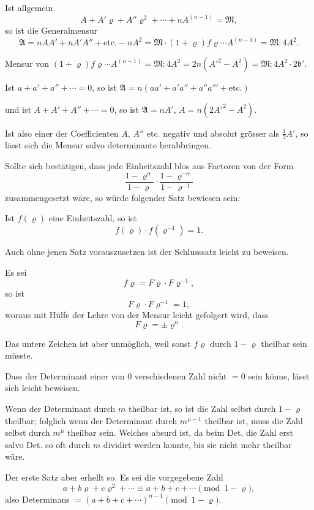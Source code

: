 \documentclass[10pt,a4paper]{article}
\begin{document}
Ist allgemein
\[
A + A'\varrho + A''\varrho^2 + \cdots + nA^{(n-1)} = \mathfrak{M},
\]
so ist die Generalmensur
\[
\mathfrak{A} = nAA' + nA'A'' + \text{etc.} - nA^2 = \mathfrak{M} \cdot (1 + \varrho)f\varrho \cdots A^{(n-1)} = \mathfrak{M} : 4A^2.
\]

Mensur von $(1 + \varrho)f\varrho \cdots A^{(n-1)} = \mathfrak{M} : 4A^2 = 2n(A'^2 - A^2) = \mathfrak{M} : 4A^2 \cdot 2\mathfrak{b}'$.

Ist $a + a' + a'' + \cdots = 0$, so ist $\mathfrak{A} = n(aa' + a'a'' + a''a''' + \text{etc.})$

und ist $A + A' + A'' + \cdots = 0$, so ist $\mathfrak{A} = nA'$, $A = n(2A'^2 - A^2)$.

Ist also einer der Coefficienten $A$, $A''$ etc.
negativ und absolut grösser als $\frac{1}{3}A'$, so lässt sich die Mensur salvo determinante herabbringen.

\newpage
\setcounter{page}{396}

Sollte sich bestätigen, dass jede Einheitszahl blos aus Factoren von der Form
\[
\frac{1 - \varrho^\alpha}{1 - \varrho} \cdot \frac{1 - \varrho^{-\alpha}}{1 - \varrho^{-1}}
\]
zusammengesetzt wäre, so würde folgender Satz bewiesen sein:

Ist $f(\varrho)$ eine Einheitszahl, so ist
\[
f(\varrho) \cdot f(\varrho^{-1}) = 1.
\]

Auch ohne jenen Satz vorauszusetzen ist der Schlusssatz leicht zu beweisen.

Es sei
\[
f\varrho = F\varrho \cdot F\varrho^{-1},
\]
so ist
\[
F\varrho \cdot F\varrho^{-1} = 1,
\]
woraus mit Hülfe der Lehre von der Mensur leicht gefolgert wird, dass
\[
F\varrho = \pm \varrho^n.
\]

Das untere Zeichen ist aber unmöglich, weil sonst $f\varrho$ durch $1 - \varrho$ theilbar sein müsste.

Dass der Determinant einer von $0$ verschiedenen Zahl nicht $= 0$ sein könne, lässt sich leicht beweisen.

Wenn der Determinant durch $m$ theilbar ist, so ist die Zahl selbst durch $1 - \varrho$ theilbar; folglich wenn der Determinant durch $m^{\mu-1}$ theilbar ist, muss die Zahl selbst durch $m^\mu$ theilbar sein. Welches absurd ist, da beim Det. die Zahl erst salvo Det. so oft durch $m$ dividirt werden konnte, bis sie nicht mehr theilbar wäre.

Der erste Satz aber erhellt so. Es sei die vorgegebene Zahl
\[
a + b\varrho + c\varrho^2 + \cdots \equiv a + b + c + \cdots \pmod{1 - \varrho},
\]
also Determinans $= (a + b + c + \cdots)^{n-1} \pmod{1 - \varrho}$.
\end{document}
